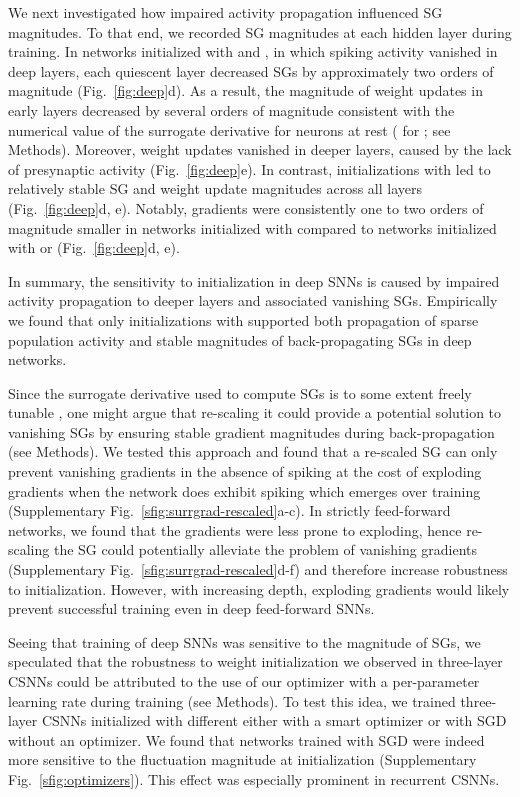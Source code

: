\documentclass[11pt,a4paper]{article}
\begin{document}
We next investigated how impaired activity propagation influenced \ac{SG} magnitudes.
To that end, we recorded \ac{SG} magnitudes at each hidden layer during training.
In networks initialized with  and , in which spiking activity vanished in deep layers, each quiescent layer decreased \acp{SG} by approximately two orders of magnitude (Fig.~\ref{fig:deep}d). 
As a result, the magnitude of weight updates in early layers decreased by several orders of magnitude consistent with the numerical value of the surrogate derivative for neurons at rest ( for ; see Methods).
Moreover, weight updates vanished in deeper layers, caused by the lack of presynaptic activity (Fig.~\ref{fig:deep}e).
In contrast, initializations with  led to relatively stable \ac{SG} and weight update magnitudes across all layers (Fig.~\ref{fig:deep}d, e). 
Notably, gradients were consistently one to two orders of magnitude smaller in networks initialized with  compared to networks initialized with  or  (Fig.~\ref{fig:deep}d, e).

In summary, the sensitivity to initialization in deep \acp{SNN} is caused by impaired activity propagation to deeper layers and associated vanishing \acp{SG}.
Empirically we found that only initializations with  supported both propagation of sparse population activity and stable magnitudes of back-propagating \acp{SG} in deep networks.

Since the surrogate derivative used to compute \acp{SG} is to some extent freely tunable \citep{Zenke2021-zg}, one might argue that re-scaling it could provide a potential solution to vanishing \acp{SG} by ensuring stable gradient magnitudes during back-propagation (see Methods).
We tested this approach and found that a re-scaled \ac{SG} can only prevent vanishing gradients in the absence of spiking at the cost of exploding gradients when the network does exhibit spiking which emerges over training (Supplementary Fig.~\ref{sfig:surrgrad-rescaled}a-c).
In strictly feed-forward networks, we found that the gradients were less prone to exploding, hence re-scaling the \ac{SG} could potentially alleviate the problem of vanishing gradients (Supplementary Fig.~\ref{sfig:surrgrad-rescaled}d-f) and therefore increase robustness to
initialization. 
However, with increasing depth, exploding gradients would likely prevent successful training even in deep feed-forward \acp{SNN}.

Seeing that training of deep \acp{SNN} was sensitive to the magnitude of \acp{SG},
we speculated that the robustness to weight initialization we observed in three-layer \acp{CSNN} could be
attributed to the use of our optimizer with a per-parameter learning
rate during training (see Methods).
To test this idea, we trained three-layer \acp{CSNN} initialized with different 
either with a smart optimizer \citep{Funk2015-xl} or with \ac{SGD} without an
optimizer.
We found that networks trained with \ac{SGD} were indeed more sensitive to the
fluctuation magnitude at initialization (Supplementary Fig.~\ref{sfig:optimizers}).
This effect was especially prominent in recurrent \acp{CSNN}.
\end{document}
